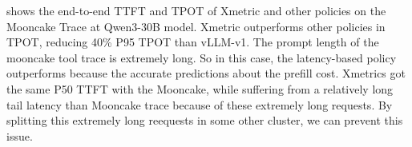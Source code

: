 

\iffalse
{} shows the end-to-end TTFT and TPOT of Xmetric and other policies on the Mooncake Trace at Qwen3-30B model.
Xmetric outperforms other policies in TPOT, reducing 40\% P95 TPOT than vLLM-v1.
The prompt length of the mooncake tool trace is extremely long. So in this case, the latency-based policy outperforms because the accurate predictions
about the prefill cost. 
Xmetrics got the same P50 TTFT with the Mooncake, while suffering from a relatively long tail latency than Mooncake trace because of these extremely long requests.
By splitting this extremely long reequests in some other cluster, we can prevent this issue.

